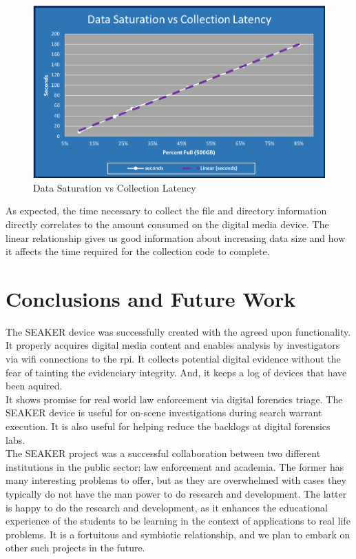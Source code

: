 \documentclass[12pt]{article}
\begin{document}
\begin{figure}[H]
  \begin{center}
  \includegraphics[width=13cm]{images/SaturationVsLatency.png}
  \caption{Data Saturation vs Collection Latency}
  \label{fig:SaturationLatency}
  \end{center}
\end{figure}

As expected, the time necessary to collect the file and directory information directly
correlates to the amount consumed on the digital media device.  The linear relationship
gives us good information about increasing data size and how it affects the time required
for the collection code to complete.\\

\section{Conclusions and Future Work}
\label{sect-conclusionAndFutureWork}

The SEAKER device was successfully created with the agreed upon functionality.  It
properly acquires digital media content and enables analysis by investigators
via \gls{wifi} connections to the \gls{rpi}.  It collects potential digital
evidence without the fear of tainting the evidenciary integrity.  And, it keeps a
log of devices that have been aquired.\\

It shows promise for real world law enforcement via digital forensics triage.  The
SEAKER device is useful for on-scene investigations during search warrant
execution.  It is also useful for helping reduce the backlogs at digital
forensics labs.\\

The SEAKER project was a successful collaboration between two different institutions in the public
sector: law enforcement and academia. The former has many interesting problems to offer, but as they
are overwhelmed with cases they typically do not have the man power to do research and development.
The latter is happy to do the research and development, as it enhances the educational experience of the students to be learning
in the context of applications to real life problems. It is a fortuitous and symbiotic relationship, and we
plan to embark on other such projects in the future.\\
\end{document}
